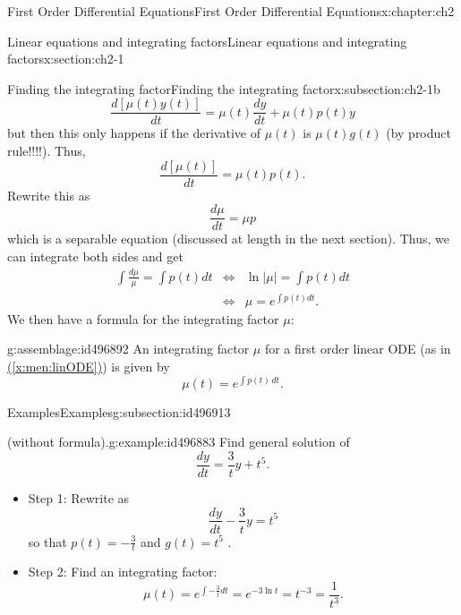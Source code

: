 \documentclass[oneside,10pt,]{book}
\newcommand{\xreffont}{\relax}
\numberwithin{equation}{section}
\numberwithin{equation}{section}
\newcommand{\amp}{&}
\begin{document}
\begin{chapterptx}{First Order Differential Equations}{}{First Order Differential Equations}{}{}{x:chapter:ch2}
\begin{sectionptx}{Linear equations and integrating factors}{}{Linear equations and integrating factors}{}{}{x:section:ch2-1}
\begin{subsectionptx}{Finding the integrating factor}{}{Finding the integrating factor}{}{}{x:subsection:ch2-1b}
\begin{equation*}
\frac{d\left[\mu(t)y(t)\right]}{dt}=\mu(t)\frac{dy}{dt}+\mu(t)p(t)y
\end{equation*}
but then this only happens if the derivative of \(\mu(t)\) is \(\mu(t)g(t)\) (by product rule!!!!). Thus,%
\begin{equation*}
\frac{d\left[\mu(t)\right]}{dt}=\mu(t)p(t).
\end{equation*}
Rewrite this as%
\begin{equation*}
\frac{d\mu}{dt}=\mu p
\end{equation*}
which is a separable equation (discussed at length in the next section). Thus, we can integrate both sides and get%
\begin{align*}
\int\frac{d\mu}{\mu}=\int p(t)dt \amp \iff \amp \ln\left|\mu\right|=\int p(t)dt\\
\amp \iff \amp \mu=e^{\int p(t)dt}.
\end{align*}
We then have a formula for the integrating factor \(\mu\):%
\begin{assemblage}{}{g:assemblage:id496892}%
An integrating factor \(\mu\) for a first order linear ODE (as in \hyperref[x:men:linODE]{({\xreffont\ref{x:men:linODE}})}) is given by%
\begin{equation*}
\mu(t)=e^{\int p(t)\,dt}.
\end{equation*}
%
\end{assemblage}
\end{subsectionptx}
%
%
\typeout{************************************************}
\typeout{************************************************}
%
\begin{subsectionptx}{Examples}{}{Examples}{}{}{g:subsection:id496913}
\begin{example}{(without formula).}{g:example:id496883}%
Find general solution of%
\begin{equation*}
\frac{dy}{dt}=\frac{3}{t}y+t^{5}.
\end{equation*}
%
%
\begin{itemize}[label=\textbullet]
\item{}Step 1: Rewrite as%
\begin{equation*}
\frac{dy}{dt}-\frac{3}{t}y=t^{5}
\end{equation*}
so that \(p(t)=-\frac{3}{t}\) and \(g(t)=t^{5}\)%
. \item{}Step 2: Find an integrating factor:%
\begin{equation*}
\mu(t)=e^{\int-\frac{3}{t}dt}=e^{-3\ln t}=t^{-3}=\frac{1}{t^{3}}.
\end{equation*}

\end{itemize}
\end{example}
\end{subsectionptx}
\end{sectionptx}
\end{chapterptx}
\end{document}
